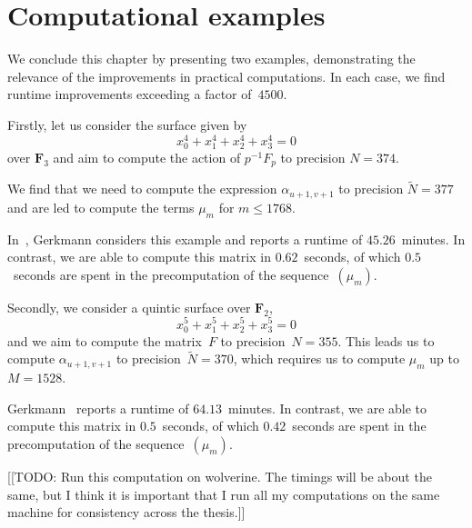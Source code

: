 
\section{Computational examples} 

We conclude this chapter by presenting two examples, demonstrating the 
relevance of the improvements in practical computations.  In each case, 
we find runtime improvements exceeding a factor of~$4500$.

Firstly, let us consider the surface given by 
\begin{equation*}
x_0^4 + x_1^4 + x_2^4 + x_3^4 = 0
\end{equation*}
over $\mathbf{F}_3$ and aim to compute the action of $p^{-1} F_p$ 
to precision $N = 374$.

We find that we need to compute the expression $\alpha_{u+1,v+1}$ to 
precision $\tilde{N} = 377$ and are led to compute the terms $\mu_m$ for 
$m \leq 1768$.

In~\citep[Section~7.4]{Gerkmann2007}, Gerkmann considers this example 
and reports a runtime of $45.26$~minutes.  In contrast, we are able 
to compute this matrix in $0.62$~seconds, of which $0.5$~seconds are 
spent in the precomputation of the sequence~$(\mu_m)$.

Secondly, we consider a quintic surface over $\mathbf{F}_2$, 
\begin{equation*}
x_0^5 + x_1^5 + x_2^5 + x_3^5 = 0
\end{equation*}
and we aim to compute the matrix~$F$ to precision~$N = 355$.  This leads 
us to compute $\alpha_{u+1,v+1}$ to precision~$\tilde{N} = 370$, which 
requires us to compute $\mu_{m}$ up to $M = 1528$.

Gerkmann~\citep[Section~7.6]{Gerkmann2007} reports a runtime of 
$64.13$~minutes.  In contrast, we are able to compute this matrix 
in $0.5$~seconds, of which $0.42$~seconds are spent in the precomputation 
of the sequence~$(\mu_m)$.

[[TODO:  Run this computation on wolverine.  The timings will be 
about the same, but I think it is important that I run all my 
computations on the same machine for consistency across the thesis.]]

